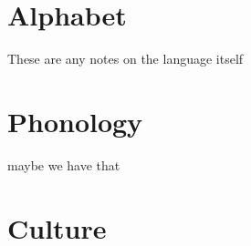 \section*{Alphabet}
These are any notes on the language itself
\vspace{1.5pc}


\section*{Phonology}
maybe we have that

\vspace{1.5pc}
\section*{Culture}
